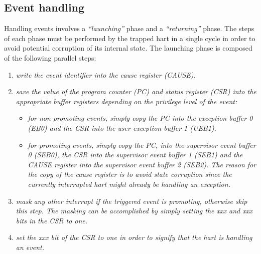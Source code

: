    \subsection{Event handling}

        \vspace{10pt}

        Handling events involves a \textit{``launching''} phase and a \textit{``returning''} phase. The steps of each phase must be performed by the trapped hart in a single cycle in order to avoid potential corruption of its internal state. The launching phase is composed of the following parallel steps:

        \begin{enumerate}

            \item \textit{write the event identifier into the cause register (CAUSE).}

            \item \textit{save the value of the program counter (PC) and status register (CSR) into the appropriate buffer registers depending on the privilege level of the event:}

                \begin{itemize}

                    \item \textit{for non-promoting events, simply copy the PC into the exception buffer 0 (EB0) and the CSR into the user exception buffer 1 (UEB1).}

                    \item \textit{for promoting events, simply copy the PC, into the supervisor event buffer 0 (SEB0), the CSR into the supervisor event buffer 1 (SEB1) and the CAUSE register into the supervisor event buffer 2 (SEB2). The reason for the copy of the cause register is to avoid state corruption since the currently interrupted hart might already be handling an exception.}

                \end{itemize}

            \item \textit{mask any other interrupt if the triggered event is promoting, otherwise skip this step. The masking can be accomplished by simply setting the xxx and xxx bits in the CSR to one.}

            \item \textit{set the xxx bit of the CSR to one in order to signify that the hart is handling an event.}


\end{enumerate}
